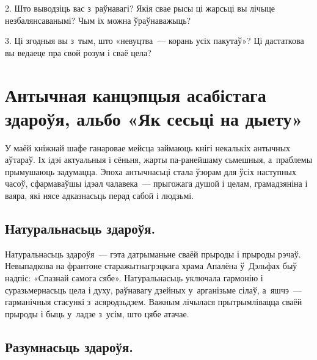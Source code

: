 2. Што выводзіць вас з~раўнавагі? Якія свае рысы ці жарсьці вы лічыце незбалянсаванымі? Чым іх можна ўраўнаважыць?

3. Ці згодныя вы з~тым, што «невуцтва~--- корань усіх пакутаў»? Ці дастаткова вы ведаеце пра свой розум і сваё цела?


\section[Антычная канцэпцыя асабістага здароўя, альбо «Як сесьці на дыету»][Антычная канцэпцыя асабістага здароўя]{Антычная канцэпцыя асабістага здароўя, альбо «Як сесьці на дыету»}


У маёй кніжнай шафе ганаровае мейсца займаюць кнігі некалькіх антычных аўтараў. Іх ідэі актуальныя і сёньня, жарты па-ранейшаму сьмешныя, а~праблемы прымушаюць задумацца. Эпоха антычнасьці стала ўзорам для ўсіх наступных часоў, сфармаваўшы ідэал чалавека~--- прыгожага душой і целам, грамадзяніна і ваяра, які нясе адказнасьць перад сабой і людзьмі. 


\subsection*{Натуральнасьць здароўя.} 

Натуральнасьць здароўя~--- гэта датрыманьне сваёй прыроды і прыроды рэчаў. Невыпадкова на франтоне старажытнагрэцкага храма Апалёна ў~Дэльфах быў надпіс: «Спазнай самога сябе». Натуральнасьць уключала гармонію і суразьмернасьць цела і духу, раўнавагу дзейных у~арганізьме сілаў, а~яшчэ~--- гарманічныя стасункі з~асяродзьдзем. Важным лічылася прытрымлівацца сваёй прыроды і быць у~ладзе з~усім, што цябе атачае.


\subsection*{Разумнасьць здароўя.} 

